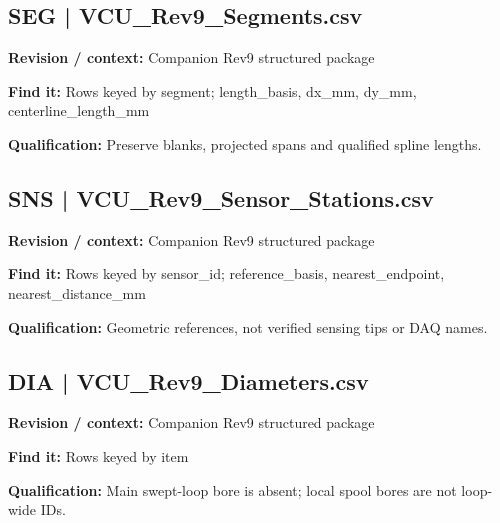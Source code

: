 \documentclass[11pt]{article}
\begin{document}
\par\noindent\begin{minipage}{\textwidth}\small
\subsection*{SEG | VCU\_\allowbreak{}Rev9\_\allowbreak{}Segments.csv}
\textbf{Revision / context:} Companion Rev9 structured package\par
\textbf{Find it:} Rows keyed by segment; length\_\allowbreak{}basis, dx\_\allowbreak{}mm, dy\_\allowbreak{}mm, centerline\_\allowbreak{}length\_\allowbreak{}mm\par
\textbf{Qualification:} Preserve blanks, projected spans and qualified spline lengths.\par
\end{minipage}\par\vspace{5pt}
\par\noindent\begin{minipage}{\textwidth}\small
\subsection*{SNS | VCU\_\allowbreak{}Rev9\_\allowbreak{}Sensor\_\allowbreak{}Stations.csv}
\textbf{Revision / context:} Companion Rev9 structured package\par
\textbf{Find it:} Rows keyed by sensor\_\allowbreak{}id; reference\_\allowbreak{}basis, nearest\_\allowbreak{}endpoint, nearest\_\allowbreak{}distance\_\allowbreak{}mm\par
\textbf{Qualification:} Geometric references, not verified sensing tips or DAQ names.\par
\end{minipage}\par\vspace{5pt}
\par\noindent\begin{minipage}{\textwidth}\small
\subsection*{DIA | VCU\_\allowbreak{}Rev9\_\allowbreak{}Diameters.csv}
\textbf{Revision / context:} Companion Rev9 structured package\par
\textbf{Find it:} Rows keyed by item\par
\textbf{Qualification:} Main swept-loop bore is absent; local spool bores are not loop-wide IDs.\par
\end{minipage}\par\vspace{5pt}
\end{document}
